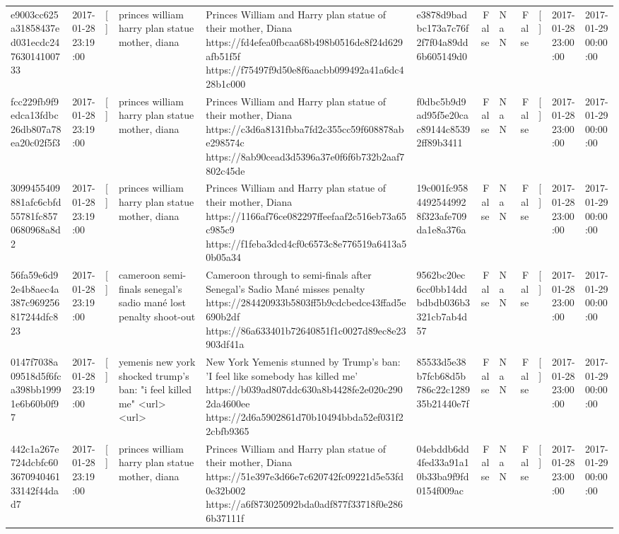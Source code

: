 \begin{tabular}{llllllrlrlll}
e9003cc625a31858437ed031ecdc24763014100733 & 2017-01-28 23:19:00 & [] & princes william harry plan statue mother, diana & Princes William and Harry plan statue of their mother, Diana https://fd4efea0fbcaa68b498b0516de8f24d629afb51f5f https://f75497f9d50e8f6aacbb099492a41a6dc428b1c000 & e3878d9badbc173a7c76f2f7f04a89dd6b605149d0 & False & NaN & False & [] & 2017-01-28 23:00:00 & 2017-01-29 00:00:00 \\
fcc229fb9f9edca13fdbc26db807a78ea20c02f5f3 & 2017-01-28 23:19:00 & [] & princes william harry plan statue mother, diana & Princes William and Harry plan statue of their mother, Diana https://c3d6a8131fbba7fd2c355cc59f608878abe298574c https://8ab90cead3d5396a37e0f6f6b732b2aaf7802c45de & f0dbc5b9d9ad95f5e20cac89144c85392ff89b3411 & False & NaN & False & [] & 2017-01-28 23:00:00 & 2017-01-29 00:00:00 \\
3099455409881afc6cbfd55781fc8570680968a8d2 & 2017-01-28 23:19:00 & [] & princes william harry plan statue mother, diana & Princes William and Harry plan statue of their mother, Diana https://1166af76ce082297ffeefaaf2c516eb73a65c985c9 https://f1feba3dcd4cf0c6573c8e776519a6413a50b05a34 & 19c001fc95844925449928f323afe709da1e8a376a & False & NaN & False & [] & 2017-01-28 23:00:00 & 2017-01-29 00:00:00 \\
56fa59e6d92e4b8aec4a387c969256817244dfc823 & 2017-01-28 23:19:00 & [] & cameroon semi-finals senegal's sadio mané lost penalty shoot-out & Cameroon through to semi-finals after Senegal’s Sadio Mané misses penalty https://284420933b5803ff5b9cdcbedce43ffad5e690b2df https://86a633401b72640851f1c0027d89ec8e23903df41a & 9562bc20ec6cc0bb14ddbdbdb036b3321cb7ab4d57 & False & NaN & False & [] & 2017-01-28 23:00:00 & 2017-01-29 00:00:00 \\
0147f7038a09518d5f6fca398bb19991e6b60b0f97 & 2017-01-28 23:19:00 & [] & yemenis new york shocked trump's ban: "i feel killed me" <url> <url> & New York Yemenis stunned by Trump's ban: 'I feel like somebody has killed me' https://b039ad807ddc630a8b4428fe2e020c2902da4600ee https://2d6a5902861d70b10494bbda52ef031f22cbfb9365 & 85533d5e38b7fcb68d5b786c22c128935b21440e7f & False & NaN & False & [] & 2017-01-28 23:00:00 & 2017-01-29 00:00:00 \\
442c1a267e724dcbfc60367094046133142f44dad7 & 2017-01-28 23:19:00 & [] & princes william harry plan statue mother, diana & Princes William and Harry plan statue of their mother, Diana https://51e397e3d66e7c620742fc09221d5e53fd0e32b002 https://a6f873025092bda0adf877f33718f0e2866b37111f & 04ebddb6dd4fed33a91a10b33ba9f9fd0154f009ac & False & NaN & False & [] & 2017-01-28 23:00:00 & 2017-01-29 00:00:00 \\

\end{tabular}
